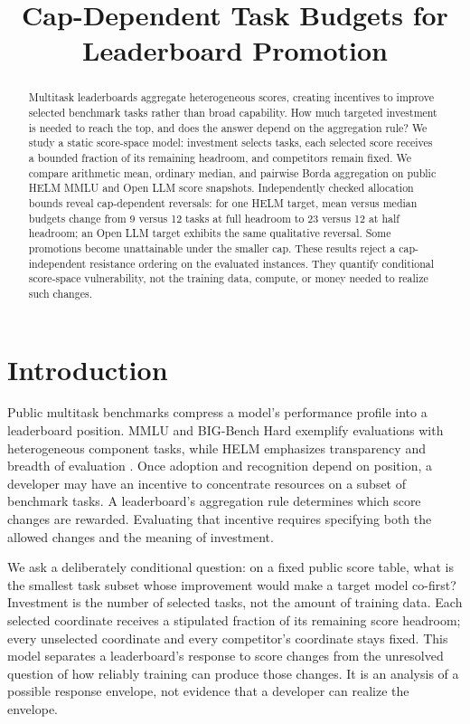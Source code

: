 \documentclass{article}
\title{Cap-Dependent Task Budgets for Leaderboard Promotion}
\begin{document}
\maketitle

\begin{abstract}
Multitask leaderboards aggregate heterogeneous scores, creating incentives to improve selected benchmark tasks rather than broad capability. How much targeted investment is needed to reach the top, and does the answer depend on the aggregation rule? We study a static score-space model: investment selects tasks, each selected score receives a bounded fraction of its remaining headroom, and competitors remain fixed. We compare arithmetic mean, ordinary median, and pairwise Borda aggregation on public HELM MMLU and Open LLM score snapshots. Independently checked allocation bounds reveal cap-dependent reversals: for one HELM target, mean versus median budgets change from 9 versus 12 tasks at full headroom to 23 versus 12 at half headroom; an Open LLM target exhibits the same qualitative reversal. Some promotions become unattainable under the smaller cap. These results reject a cap-independent resistance ordering on the evaluated instances. They quantify conditional score-space vulnerability, not the training data, compute, or money needed to realize such changes.
\end{abstract}

\section{Introduction}
Public multitask benchmarks compress a model's performance profile into a leaderboard position. MMLU and BIG-Bench Hard exemplify evaluations with heterogeneous component tasks, while HELM emphasizes transparency and breadth of evaluation \citep{Hendrycks2020MMLU,Suzgun2022BBH,Liang2022HELM}. Once adoption and recognition depend on position, a developer may have an incentive to concentrate resources on a subset of benchmark tasks. A leaderboard's aggregation rule determines which score changes are rewarded. Evaluating that incentive requires specifying both the allowed changes and the meaning of investment.

We ask a deliberately conditional question: on a fixed public score table, what is the smallest task subset whose improvement would make a target model co-first? Investment is the number of selected tasks, not the amount of training data. Each selected coordinate receives a stipulated fraction of its remaining score headroom; every unselected coordinate and every competitor's coordinate stays fixed. This model separates a leaderboard's response to score changes from the unresolved question of how reliably training can produce those changes. It is an analysis of a possible response envelope, not evidence that a developer can realize the envelope.
\end{document}
